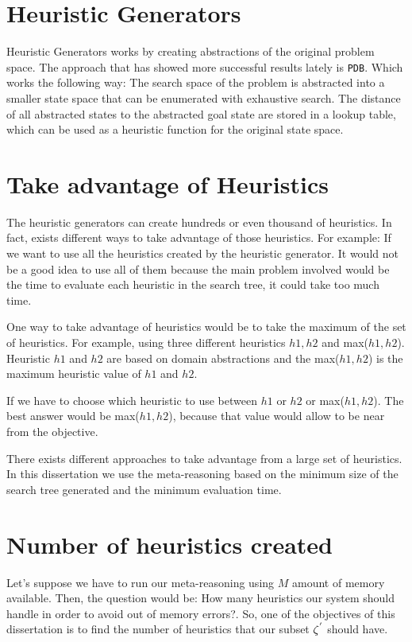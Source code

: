 \section{Heuristic Generators}
Heuristic Generators works by creating abstractions of the original problem space. The approach that has showed more successful results lately is \texttt{PDB}. Which works the following way: The search space of the problem is abstracted into a smaller state space that can be enumerated with exhaustive search. The distance of all abstracted states to the abstracted goal state are stored in a lookup table, which can be used as a heuristic function for the original state space.\\

\section{Take advantage of Heuristics}
The heuristic generators can create hundreds or even thousand of heuristics. In fact, exists different ways to take advantage of those heuristics. For example: If we want to use all the heuristics created by the heuristic generator. It would not be a good idea to use all of them because the main problem involved would be the time to evaluate each heuristic in the search tree, it could take too much time.

One way to take advantage of heuristics would be to take the maximum of the set of heuristics. For example, using three different heuristics $h1, h2$ and max($h1, h2$). Heuristic $h1$ and $h2$ are based on domain abstractions and the max($h1, h2$) is the maximum heuristic value of $h1$ and $h2$.

If we have to choose which heuristic to use between $h1$ or $h2$ or max($h1, h2$). The best answer would be max($h1, h2$), because that value would allow to be near from the objective.

There exists different approaches to take advantage from a large set of heuristics. In this dissertation we use the meta-reasoning based on the minimum size of the search tree generated and the minimum evaluation time.

\section{Number of heuristics created}
Let's suppose we have to run our meta-reasoning using $M$ amount of memory available. Then, the question would be: How many heuristics our system should handle in order to avoid out of memory errors?. So, one of the objectives of this dissertation is to find the number of heuristics that our subset $\zeta\sp{'}$ should have.
 
